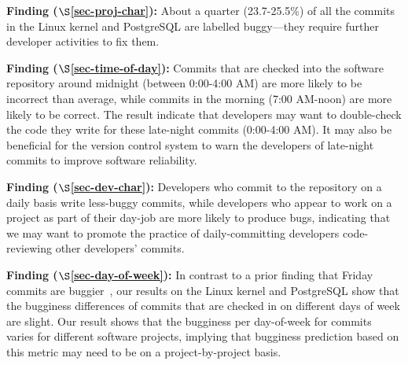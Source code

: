 \begin{list}{}{\topsep=0pt\parsep=0pt\leftmargin=9pt\itemindent=0pt}

\item {\bf Finding \fbuggy ($\S$\ref{sec-proj-char}):} 
About a quarter (23.7-25.5\%) of all the commits in the Linux kernel and
PostgreSQL are labelled buggy---they require further developer activities to fix
them.

\item {\bf Finding \fhour ($\S$\ref{sec-time-of-day}):} 
Commits that are checked into the software repository around midnight (between
0:00-4:00 AM) are more likely to be incorrect than average, while commits in the
morning (7:00 AM-noon) are more likely to be correct. The result indicate that
developers may want to double-check the code they write for these late-night
commits (0:00-4:00 AM). It may also be beneficial for the version control
system to warn the developers of late-night commits to improve software
reliability.

\item {\bf Finding \fdaily ($\S$\ref{sec-dev-char}):} 
Developers who commit to the repository on a daily basis write less-buggy
commits, while developers who appear to work on a project as part of their
day-job are more likely to produce bugs, indicating that we may want to promote
the practice of daily-committing developers code-reviewing other developers'
commits.

\item {\bf Finding \fday ($\S$\ref{sec-day-of-week}):} 
In contrast to a prior finding that Friday commits are
buggier~\cite{sliwerski-msr-2005}, our results on the Linux kernel and
PostgreSQL show that the bugginess differences of commits that are checked in on
different days of week are slight. Our result shows that the bugginess per
day-of-week for commits varies for different software projects, implying that
bugginess prediction based on this metric may need to be on a project-by-project
basis.

\end{list}
